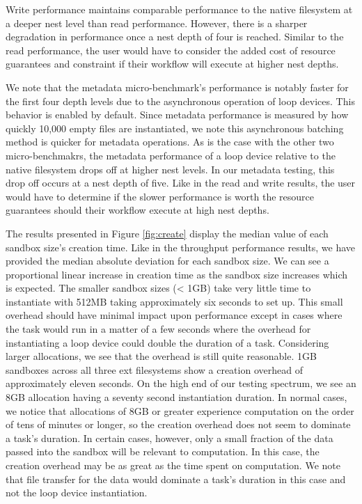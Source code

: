 \documentclass[conference]{IEEEtran}
\begin{document}
Write performance maintains comparable performance to the native filesystem at a deeper nest level than read performance. However, there is a sharper degradation in performance once a nest depth of four is reached. Similar to the read performance, the user would have to consider the added cost of resource guarantees and constraint if their workflow will execute at higher nest depths. 

We note that the metadata micro-benchmark's performance is notably faster for the first four depth levels due to the asynchronous operation of loop devices. This behavior is enabled by default. Since metadata performance is measured by how quickly 10,000 empty files are instantiated, we note this asynchronous batching method is quicker for metadata operations. As is the case with the other two micro-benchmakrs, the metadata performance of a loop device relative to the native filesystem drops off at higher nest levels. In our metadata testing, this drop off occurs at a nest depth of five. Like in the read and write results, the user would have to determine if the slower performance is worth the resource guarantees should their workflow execute at high nest depths.

The results presented in Figure \ref{fig:create} display the median value of each sandbox size's creation time. Like in the throughput performance results, we have provided the median absolute deviation for each sandbox size. We can see a proportional linear increase in creation time as the sandbox size increases which is expected. The smaller sandbox sizes (< 1GB) take very little time to instantiate with 512MB taking approximately six seconds to set up. This small overhead should have minimal impact upon performance except in cases where the task would run in a matter of a few seconds where the overhead for instantiating a loop device could double the duration of a task. Considering larger allocations, we see that the overhead is still quite reasonable. 1GB sandboxes across all three ext filesystems show a creation overhead of approximately eleven seconds. On the high end of our testing spectrum, we see an 8GB allocation having a seventy second instantiation duration. In normal cases, we notice that allocations of 8GB or greater experience computation on the order of tens of minutes or longer, so the creation overhead does not seem to dominate a task's duration. In certain cases, however, only a small fraction of the data passed into the sandbox will be relevant to computation. In this case, the creation overhead may be as great as the time spent on computation. We note that file transfer for the data would dominate a task's duration in this case and not the loop device instantiation.
\end{document}
